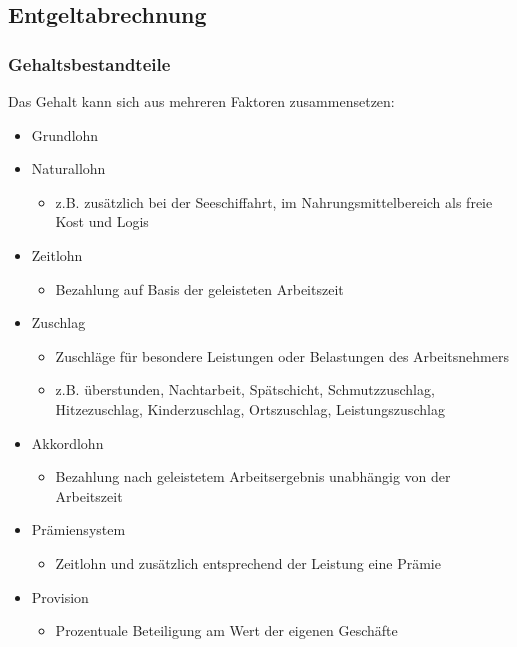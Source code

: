 
\subsection{Entgeltabrechnung}

\subsubsection{Gehaltsbestandteile} 
Das Gehalt kann sich aus mehreren Faktoren zusammensetzen:
\begin{itemize}
	\item Grundlohn
	\item Naturallohn
		\begin{itemize}
			\item z.B. zusätzlich bei der Seeschiffahrt, im Nahrungsmittelbereich als \ql freie Kost und Logis\qr\
		\end{itemize}
	\item Zeitlohn
		\begin{itemize}
			\item Bezahlung auf Basis der geleisteten Arbeitszeit
		\end{itemize}
	\item Zuschlag
		\begin{itemize}
			\item Zuschläge für besondere Leistungen oder Belastungen des Arbeitsnehmers
			\item z.B. überstunden, Nachtarbeit, Spätschicht, Schmutzzuschlag, Hitzezuschlag, Kinderzuschlag, Ortszuschlag, Leistungszuschlag
		\end{itemize}
	\item Akkordlohn
		\begin{itemize}
			\item Bezahlung nach geleistetem Arbeitsergebnis unabhängig von der Arbeitszeit
		\end{itemize}
	\item Prämiensystem
		\begin{itemize}
			\item Zeitlohn und zusätzlich entsprechend der Leistung eine Prämie
		\end{itemize}
	\item Provision
		\begin{itemize}
			 \item Prozentuale Beteiligung am Wert der eigenen Geschäfte

\end{itemize}
\end{itemize}
